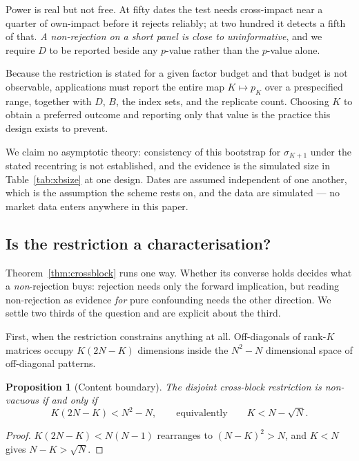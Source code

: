 \documentclass[10pt,twocolumn]{article}
\newtheorem{proposition}{Proposition}
\theoremstyle{remark}
\begin{document}
Power is real but not free. At fifty dates the test needs cross-impact near a
quarter of own-impact before it rejects reliably; at two hundred it detects a
fifth of that. \emph{A non-rejection on a short panel is close to
uninformative}, and we require $D$ to be reported beside any $p$-value rather
than the $p$-value alone.

Because the restriction is stated for a given factor budget and that budget is
not observable, applications must report the entire map $K\mapsto p_K$ over a
prespecified range, together with $D$, $B$, the index sets, and the replicate
count. Choosing $K$ to obtain a preferred outcome and reporting only that value
is the practice this design exists to prevent.

We claim no asymptotic theory: consistency of this bootstrap for
$\sigma_{K+1}$ under the stated recentring is not established, and the evidence
is the simulated size in Table~\ref{tab:xbsize} at one design. Dates are
assumed independent of one another, which is the assumption the scheme rests
on, and the data are simulated --- no market data enters anywhere in this
paper.

\subsection{Is the restriction a characterisation?}
\label{sec:converse}

Theorem~\ref{thm:crossblock} runs one way. Whether its converse holds decides
what a \emph{non}-rejection buys: rejection needs only the forward implication,
but reading non-rejection as evidence \emph{for} pure confounding needs the
other direction. We settle two thirds of the question and are explicit about
the third.

First, when the restriction constrains anything at all. Off-diagonals of
rank-$K$ matrices occupy $K(2N-K)$ dimensions inside the $N^2-N$ dimensional
space of off-diagonal patterns.

\begin{proposition}[Content boundary]
\label{prop:content}
The disjoint cross-block restriction is non-vacuous if and only if
\begin{equation}
K(2N-K)<N^2-N,\qquad\text{equivalently}\qquad K<N-\sqrt N.
\label{eq:content}
\end{equation}
\end{proposition}

\begin{proof}
$K(2N-K)<N(N-1)$ rearranges to $(N-K)^2>N$, and $K<N$ gives $N-K>\sqrt N$.
\end{proof}
\end{document}

